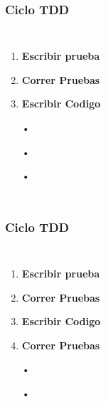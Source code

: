 \documentclass{beamer}
\begin{document}
\begin{frame}
\frametitle{Ciclo TDD}
\begin{columns}[c] %

\begin{enumerate}
\item \textbf{Escribir prueba}
\item {\color{red}\textbf{Correr Pruebas}}
\item \textbf{Escribir Codigo}
\item[•]	
\item[•]	
\item[•]	
\end{enumerate}

\end{columns}
\end{frame}

\begin{frame}
\frametitle{Ciclo TDD}
\begin{columns}[c] %

\begin{enumerate}
\item \textbf{Escribir prueba}
\item {\color{red}\textbf{Correr Pruebas}}
\item \textbf{Escribir Codigo}
\item {\color{green}\textbf{Correr Pruebas}}
\item[•]	
\item[•]	
\end{enumerate}

\end{columns}
\end{frame}
\end{document}
